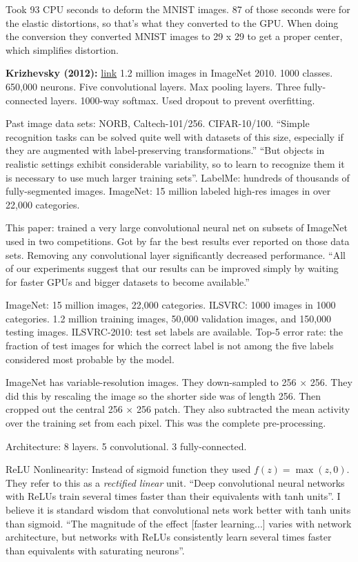 \documentclass[12pt]{article}
\newcommand{\link}[2]{\href{#1}{#2}}
\begin{document}
Took 93 CPU seconds to deform the MNIST images.  87 of those seconds
were for the elastic distortions, so that's what they converted to the
GPU.  When doing the conversion they converted MNIST images to 29 x 29
to get a proper center, which simplifies distortion.

\textbf{Krizhevsky (2012):}
\link{http://www.cs.toronto.edu/~hinton/absps/imagenet.pdf}{link} 1.2
million images in ImageNet 2010.  1000 classes.  650,000 neurons.
Five convolutional layers.  Max pooling layers.  Three fully-connected
layers.  1000-way softmax.  Used dropout to prevent overfitting.

Past image data sets: NORB, Caltech-101/256. CIFAR-10/100.  ``Simple
recognition tasks can be solved quite well with datasets of this size,
especially if they are augmented with label-preserving
transformations.''  ``But objects in realistic settings exhibit
considerable variability, so to learn to recognize them it is
necessary to use much larger training sets''.  LabelMe: hundreds of
thousands of fully-segmented images.  ImageNet: 15 million labeled
high-res images in over 22,000 categories.

This paper: trained a very large convolutional neural net on subsets
of ImageNet used in two competitions.  Got by far the best results
ever reported on those data sets.  Removing any convolutional layer
significantly decreased performance.  ``All of our experiments suggest
that our results can be improved simply by waiting for faster GPUs and
bigger datasets to become available.''

ImageNet: 15 million images, 22,000 categories.  ILSVRC: 1000 images
in 1000 categories.  1.2 million training images, 50,000 validation
images, and 150,000 testing images.  ILSVRC-2010: test set labels are
available.  Top-5 error rate: the fraction of test images for which
the correct label is not among the five labels considered most
probable by the model.

ImageNet has variable-resolution images.  They down-sampled to 256
$\times$ 256.  They did this by rescaling the image so the shorter
side was of length 256.  Then cropped out the central 256 $\times$ 256
patch.  They also subtracted the mean activity over the training set
from each pixel.  This was the complete pre-processing.

Architecture: 8 layers.  5 convolutional.  3 fully-connected.

ReLU Nonlinearity: Instead of sigmoid function they used $f(z) =
\max(z, 0)$.  They refer to this as a \emph{rectified linear} unit.
``Deep convolutional neural networks with ReLUs train several times
faster than their equivalents with tanh units''.  I believe it is
standard wisdom that convolutional nets work better with tanh units
than sigmoid.  ``The magnitude of the effect [faster learning...]
varies with network architecture, but networks with ReLUs consistently
learn several times faster than equivalents with saturating neurons''.
\end{document}
